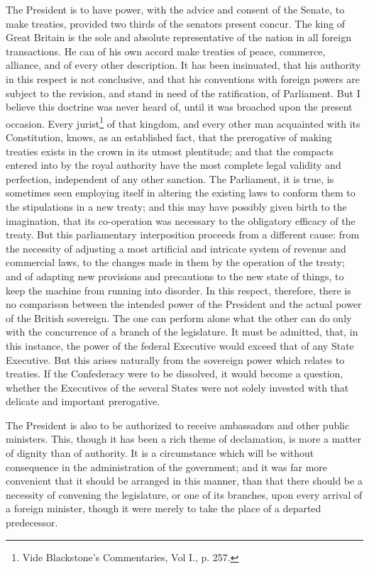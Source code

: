 The President is to have power, with the advice and consent of the Senate, to make treaties, provided two thirds of the senators present concur. 
The king of Great Britain is the sole and absolute representative of the nation in all foreign transactions. 
He can of his own accord make treaties of peace, commerce, alliance, and of every other description. 
It has been insinuated, that his authority in this respect is not conclusive, and that his conventions with foreign powers are subject to the revision, and stand in need of the ratification, of Parliament. 
But I believe this doctrine was never heard of, until it was broached upon the present occasion. 
Every jurist\footnote{Vide Blackstone's Commentaries, Vol I., p. 
257.} of that kingdom, and every other man acquainted with its Constitution, knows, as an established fact, that the prerogative of making treaties exists in the crown in its utmost plentitude; and that the compacts entered into by the royal authority have the most complete legal validity and perfection, independent of any other sanction. 
The Parliament, it is true, is sometimes seen employing itself in altering the existing laws to conform them to the stipulations in a new treaty; and this may have possibly given birth to the imagination, that its co-operation was necessary to the obligatory efficacy of the treaty. 
But this parliamentary interposition proceeds from a different cause: from the necessity of adjusting a most artificial and intricate system of revenue and commercial laws, to the changes made in them by the operation of the treaty; and of adapting new provisions and precautions to the new state of things, to keep the machine from running into disorder. 
In this respect, therefore, there is no comparison between the intended power of the President and the actual power of the British sovereign. 
The one can perform alone what the other can do only with the concurrence of a branch of the legislature. 
It must be admitted, that, in this instance, the power of the federal Executive would exceed that of any State Executive. 
But this arises naturally from the sovereign power which relates to treaties. 
If the Confederacy were to be dissolved, it would become a question, whether the Executives of the several States were not solely invested with that delicate and important prerogative.

The President is also to be authorized to receive ambassadors and other public ministers. 
This, though it has been a rich theme of declamation, is more a matter of dignity than of authority. 
It is a circumstance which will be without consequence in the administration of the government; and it was far more convenient that it should be arranged in this manner, than that there should be a necessity of convening the legislature, or one of its branches, upon every arrival of a foreign minister, though it were merely to take the place of a departed predecessor.

